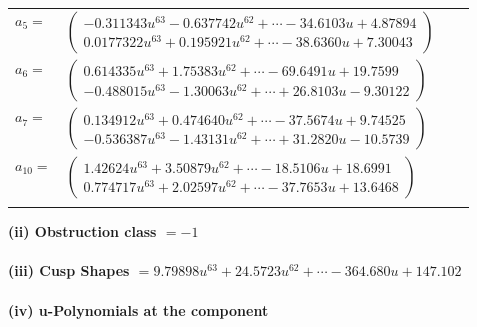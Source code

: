 \documentclass[1p]{elsarticle_modified}
\theoremstyle{definition}
\begin{document}
\begin{tabular}{m{7pt} m{180pt} m{7pt} m{180pt} }
\flushright $a_{5}=$&$\begin{pmatrix}-0.311343 u^{63}-0.637742 u^{62}+\cdots-34.6103 u+4.87894\\0.0177322 u^{63}+0.195921 u^{62}+\cdots-38.6360 u+7.30043\end{pmatrix}$ \\
\flushright $a_{6}=$&$\begin{pmatrix}0.614335 u^{63}+1.75383 u^{62}+\cdots-69.6491 u+19.7599\\-0.488015 u^{63}-1.30063 u^{62}+\cdots+26.8103 u-9.30122\end{pmatrix}$ \\
\flushright $a_{7}=$&$\begin{pmatrix}0.134912 u^{63}+0.474640 u^{62}+\cdots-37.5674 u+9.74525\\-0.536387 u^{63}-1.43131 u^{62}+\cdots+31.2820 u-10.5739\end{pmatrix}$ \\
\flushright $a_{10}=$&$\begin{pmatrix}1.42624 u^{63}+3.50879 u^{62}+\cdots-18.5106 u+18.6991\\0.774717 u^{63}+2.02597 u^{62}+\cdots-37.7653 u+13.6468\end{pmatrix}$\\&\end{tabular}
\flushleft \textbf{(ii) Obstruction class $= -1$}\\~\\
\flushleft \textbf{(iii) Cusp Shapes $= 9.79898 u^{63}+24.5723 u^{62}+\cdots-364.680 u+147.102$}\\~\\
\newpage\renewcommand{\arraystretch}{1}
\flushleft \textbf{(iv) u-Polynomials at the component}\newline \\
\end{document}
